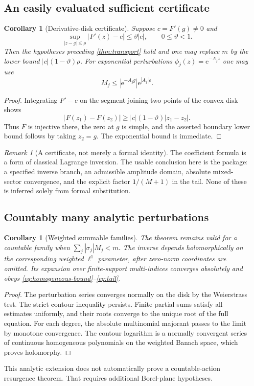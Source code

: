 \documentclass[11pt,a4paper]{article}
\numberwithin{equation}{section}
\newtheorem{corollary}[theorem]{Corollary}
\theoremstyle{definition}
\theoremstyle{remark}
\newtheorem{remark}[theorem]{Remark}
\newcommand{\e}{\mathrm e}
\begin{document}
\subsection{An easily evaluated sufficient certificate}
\begin{corollary}[Derivative-disk certificate]
\label{cor:disk}
Suppose $c=F'(g)\neq0$ and
\begin{equation}
 \sup_{|z-g|\leq\rho}|F'(z)-c|\leq\vartheta|c|,
 \qquad 0\leq\vartheta<1.
 \label{eq:derivative-disk}
\end{equation}
Then the hypotheses preceding \cref{thm:transport} hold and one may replace $m$ by the lower bound $|c|(1-\vartheta)\rho$. For exponential perturbations $\phi_j(z)=\e^{-A_jz}$ one may use
\begin{equation}
 M_j\leq |\e^{-A_jg}|\e^{|A_j|\rho}.
 \label{eq:exp-norm}
\end{equation}
\end{corollary}
\begin{proof}
Integrating $F'-c$ on the segment joining two points of the convex disk shows
\[
 |F(z_1)-F(z_2)|\geq |c|(1-\vartheta)|z_1-z_2|.
\]
Thus $F$ is injective there, the zero at $g$ is simple, and the asserted boundary lower bound follows by taking $z_2=g$. The exponential bound is immediate.
\end{proof}

\begin{remark}[A certificate, not merely a formal identity]
The coefficient formula is a form of classical Lagrange inversion. The usable conclusion here is the package: a specified inverse branch, an admissible amplitude domain, absolute mixed-sector convergence, and the explicit factor $1/(M+1)$ in the tail. None of these is inferred solely from formal substitution.
\end{remark}

\subsection{Countably many analytic perturbations}
\begin{corollary}[Weighted summable families]
\label{cor:countable}
The theorem remains valid for a countable family when
$\sum_j|\sigma_j|M_j<m$. The inverse depends holomorphically on the corresponding weighted $\ell^1$ parameter, after zero-norm coordinates are omitted. Its expansion over finite-support multi-indices converges absolutely and obeys \eqref{eq:homogeneous-bound}--\eqref{eq:tail}.
\end{corollary}
\begin{proof}
The perturbation series converges normally on the disk by the Weierstrass test. The strict contour inequality persists. Finite partial sums satisfy all estimates uniformly, and their roots converge to the unique root of the full equation. For each degree, the absolute multinomial majorant passes to the limit by monotone convergence. The contour logarithm is a normally convergent series of continuous homogeneous polynomials on the weighted Banach space, which proves holomorphy.
\end{proof}
This analytic extension does not automatically prove a countable-action resurgence theorem. That requires additional Borel-plane hypotheses.
\end{document}
